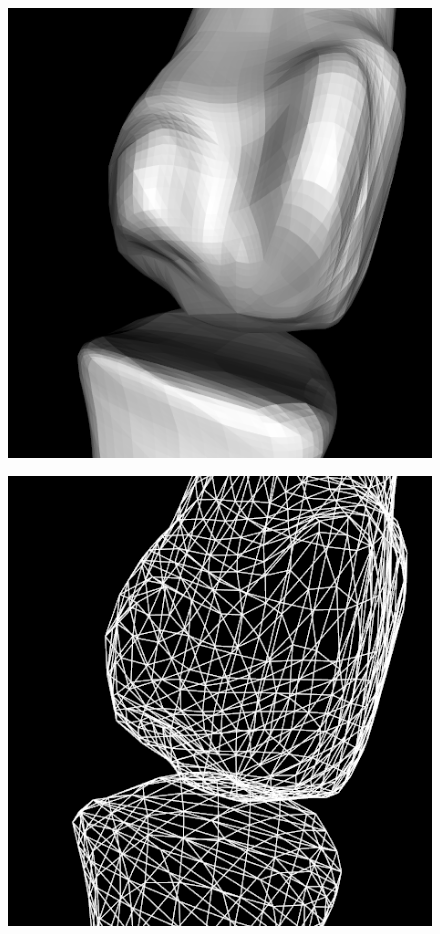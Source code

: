 \documentclass[10pt, conference, compsocconf]{IEEEtran}
\begin{document}
\begin{figure}[htbp]
{\begin{minipage}[h]{0.16\linewidth}
        \includegraphics[width=\textwidth]{./Figure/footbones/fingerBones/kpw3.png}\vspace{1ex}\\
      \end{minipage}%
      \begin{minipage}[h]{0.16\linewidth}
        \centering
        \includegraphics[width=\textwidth]{./Figure/footbones/fingerBones/kpw1-.png}\\

\end{minipage}}
\end{figure}
\end{document}
